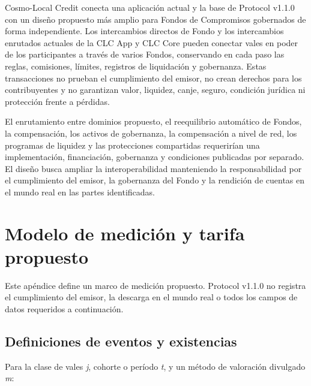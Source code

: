 \documentclass[11pt]{article}
\begin{document}
Cosmo-Local Credit conecta una aplicación actual y la base de Protocol v1.1.0 con un diseño propuesto más amplio para Fondos de Compromisos gobernados de forma independiente. Los intercambios directos de Fondo y los intercambios enrutados actuales de la CLC App y CLC Core pueden conectar vales en poder de los participantes a través de varios Fondos, conservando en cada paso las reglas, comisiones, límites, registros de liquidación y gobernanza. Estas transacciones no prueban el cumplimiento del emisor, no crean derechos para los contribuyentes y no garantizan valor, liquidez, canje, seguro, condición jurídica ni protección frente a pérdidas.

El enrutamiento entre dominios propuesto, el reequilibrio automático de Fondos, la compensación, los activos de gobernanza, la compensación a nivel de red, los programas de liquidez y las protecciones compartidas requerirían una implementación, financiación, gobernanza y condiciones publicadas por separado. El diseño busca ampliar la interoperabilidad manteniendo la responsabilidad por el cumplimiento del emisor, la gobernanza del Fondo y la rendición de cuentas en el mundo real en las partes identificadas.


\section*{Modelo de medición y tarifa propuesto}

Este apéndice define un marco de medición propuesto. Protocol v1.1.0 no registra el cumplimiento del emisor, la descarga en el mundo real o todos los campos de datos requeridos a continuación.

\subsection*{Definiciones de eventos y existencias}

Para la clase de vales \emph{j}, cohorte o período \emph{t}, y un método de valoración divulgado \emph{m}:
\end{document}
